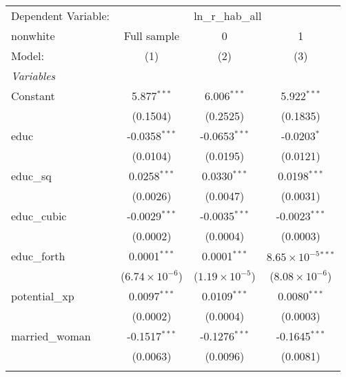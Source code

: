 
\begingroup
\centering
\begin{tabular}{lccc}
   \tabularnewline \midrule \midrule
   Dependent Variable: & \multicolumn{3}{c}{ln\_r\_hab\_all}\\
   nonwhite                        & Full sample             & 0                       & 1 \\   
   Model:                          & (1)                     & (2)                     & (3)\\  
   \midrule
   \emph{Variables}\\
   Constant                        & 5.877$^{***}$           & 6.006$^{***}$           & 5.922$^{***}$\\   
                                   & (0.1504)                & (0.2525)                & (0.1835)\\   
   educ                            & -0.0358$^{***}$         & -0.0653$^{***}$         & -0.0203$^{*}$\\   
                                   & (0.0104)                & (0.0195)                & (0.0121)\\   
   educ\_sq                        & 0.0258$^{***}$          & 0.0330$^{***}$          & 0.0198$^{***}$\\   
                                   & (0.0026)                & (0.0047)                & (0.0031)\\   
   educ\_cubic                     & -0.0029$^{***}$         & -0.0035$^{***}$         & -0.0023$^{***}$\\   
                                   & (0.0002)                & (0.0004)                & (0.0003)\\   
   educ\_forth                     & 0.0001$^{***}$          & 0.0001$^{***}$          & $8.65\times 10^{-5}$$^{***}$\\    
                                   & ($6.74\times 10^{-6}$)  & ($1.19\times 10^{-5}$)  & ($8.08\times 10^{-6}$)\\    
   potential\_xp                   & 0.0097$^{***}$          & 0.0109$^{***}$          & 0.0080$^{***}$\\   
                                   & (0.0002)                & (0.0004)                & (0.0003)\\   
   married\_woman                  & -0.1517$^{***}$         & -0.1276$^{***}$         & -0.1645$^{***}$\\   
                                   & (0.0063)                & (0.0096)                & (0.0081)\\   
$$
\end{tabular}

